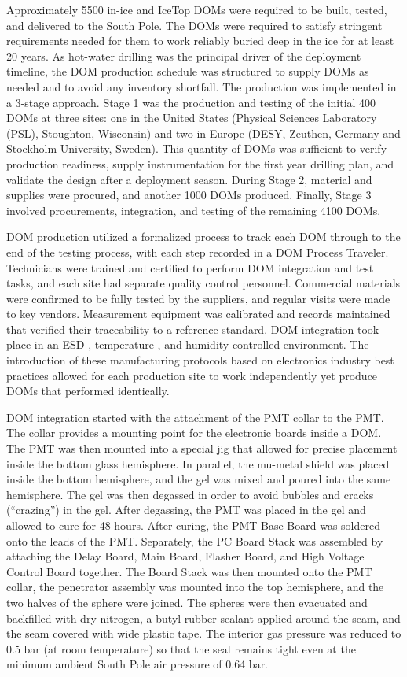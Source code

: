 Approximately 5500 in-ice and IceTop DOMs were required to be built, tested,
and delivered to the South Pole.  The DOMs were required to satisfy
stringent requirements needed for them to work reliably buried deep
in the ice for at least 20 years.  As hot-water drilling was the principal
driver of the deployment timeline, the DOM production schedule was
structured to supply DOMs as needed and to avoid any inventory shortfall.
The production was implemented in a 3-stage approach. Stage 1 was
the production and testing of the initial 400 DOMs at three sites: one in the United
States (Physical Sciences Laboratory (PSL), Stoughton, Wisconsin) and two
in Europe (DESY, Zeuthen, Germany and Stockholm University, Sweden).  This
quantity of DOMs was sufficient to verify production readiness, supply
instrumentation for the first year drilling plan, and validate the design after a deployment
season.  During Stage 2, material and supplies were procured, and another
1000 DOMs produced. Finally, Stage 3 involved procurements,
integration, and testing of the remaining 4100 DOMs.

DOM production utilized a formalized process to track each DOM through to
the end of the testing process, with each step recorded in a DOM Process
Traveler.  Technicians were trained and certified to perform DOM
integration and test tasks, and each site had separate quality control
personnel. Commercial materials were confirmed to be fully tested by the
suppliers, and regular visits were made to key vendors.  Measurement
equipment was calibrated and records maintained that verified their
traceability to a reference standard.  DOM integration took place in an
ESD-, temperature-, and humidity-controlled environment.  The introduction
of these manufacturing protocols based on electronics industry best
practices allowed for each production site to work independently yet
produce DOMs that performed identically.

DOM integration started with the attachment of the PMT collar
to the PMT.  The collar provides a mounting point for the electronic boards inside
a DOM. The PMT was then mounted into a special jig that allowed for precise
placement inside the bottom glass hemisphere.  In parallel, the mu-metal
shield was placed inside the bottom hemisphere, and the
gel was mixed and poured into the same hemisphere. The gel was then
degassed in order to avoid bubbles and cracks (``crazing'') in the gel.
After degassing, the PMT was placed in the gel and allowed to cure for 48
hours.  After curing, the PMT Base Board was soldered onto the leads of the
PMT.  Separately, the PC Board Stack was assembled by attaching the Delay
Board, Main Board, Flasher Board, and High Voltage Control Board together.
The Board Stack was then mounted onto the PMT collar, the penetrator assembly
was mounted into the top hemisphere, and the two halves of the sphere were
joined.  The spheres were then evacuated and backfilled with dry nitrogen,
a butyl rubber sealant applied around the seam, and the seam covered with
wide plastic tape. The interior gas pressure was reduced to 0.5 bar (at
room temperature) so that the seal remains tight even at the minimum
ambient South Pole air pressure of 0.64 bar.

